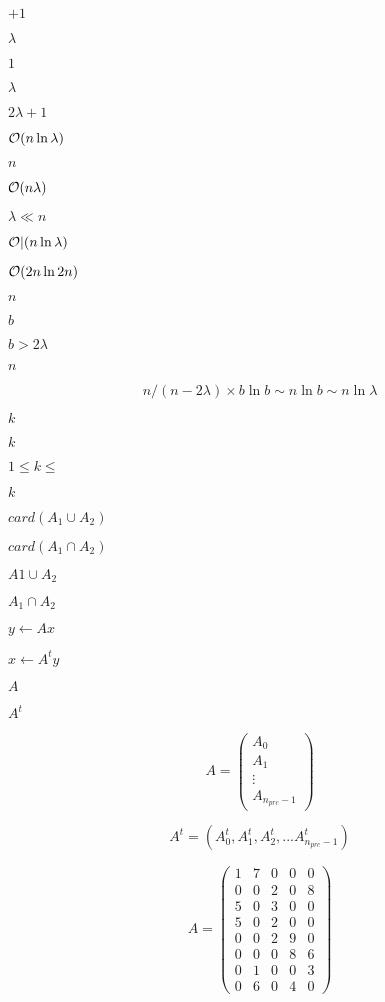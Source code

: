 \documentclass{article}
\begin{document}
$+1$
\pagebreak

$\lambda$
\pagebreak

$ 1 $
\pagebreak

$ \lambda$
\pagebreak

$ 2 \lambda + 1 $
\pagebreak

${\cal O}( n \ln \lambda)$
\pagebreak

$ n $
\pagebreak

$ {\cal O}( n \lambda)$
\pagebreak

$\lambda \ll n$
\pagebreak

$ {\cal O|}(n \ln \lambda)$
\pagebreak

${\cal O}(2 n \ln 2 n)$
\pagebreak

$ n$
\pagebreak

$ b$
\pagebreak

$ b > 2\lambda$
\pagebreak

$n$
\pagebreak

\[ n/(n-2\lambda)\times b \ln b \sim n \ln b \sim n \ln \lambda \]
\pagebreak

$k$
\pagebreak

$ k $
\pagebreak

$ 1 \le k \le $
\pagebreak

$ k$
\pagebreak

$ card(A_1 \cup A_2) $
\pagebreak

$ card(A_1 \cap A_2) $
\pagebreak

$ A1 \cup A_2 $
\pagebreak

$ A_1 \cap A_2 $
\pagebreak

$y \leftarrow A x$
\pagebreak

$x \leftarrow A^t y$
\pagebreak

$A$
\pagebreak

$A^t$
\pagebreak

\[ A = \left( \begin{array}{c}A_0 \\A_1\\ \vdots \\ A_{n_{prc}-1} \end{array} \right) \]
\pagebreak

\[ A^t=(A_0^t, A_1^t, A_2^t, ... A_{n_{prc}-1}^t) \]
\pagebreak

\[ A = \left( \begin{array}{ccccc}1&7&0&0&0\\0&0&2&0&8\\5&0&3&0&0\\5&0&2&0&0\\0&0&2&9&0\\0&0&0&8&6\\0&1&0&0&3\\0&6&0&4&0\end{array} \right) \]
\pagebreak
\end{document}
